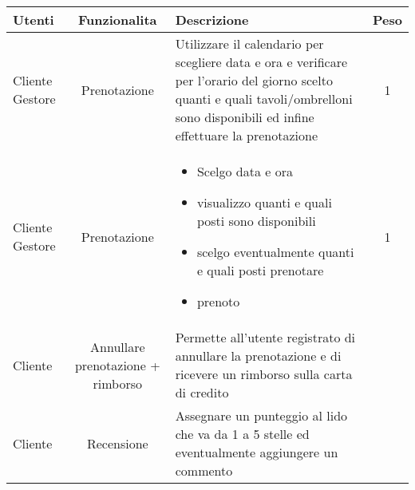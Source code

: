 \documentclass[a4paper]{article}
\begin{document}
\begin{tabularx}{\textwidth}{p{}cXc}
\toprule
Utenti & Funzionalita & Descrizione & Peso \\

\midrule
Cliente \newline Gestore & Prenotazione & Utilizzare il calendario per scegliere data e ora e verificare per l’orario del giorno scelto quanti e quali tavoli/ombrelloni
sono disponibili ed infine effettuare la prenotazione & 1\\

\midrule
Cliente \newline Gestore & Prenotazione & 
\begin{itemize}
\item Scelgo data e ora
\item visualizzo quanti e quali posti sono disponibili
\item scelgo eventualmente quanti e quali posti prenotare
\item prenoto
\end{itemize}
& 1\\

\midrule
Cliente & Annullare prenotazione + rimborso & Permette all'utente registrato di annullare la prenotazione e di ricevere un rimborso sulla carta di credito\\

\midrule
Cliente & Recensione & Assegnare un punteggio al lido che va da 1 a 5 stelle ed eventualmente aggiungere un commento\\

\bottomrule
\end{tabularx}
\end{document}
